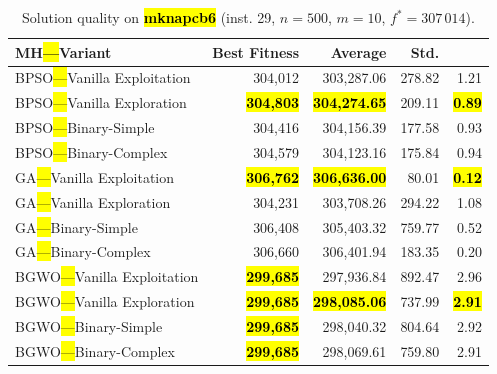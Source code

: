 \documentclass[mathematics,article,accept,moreauthors]{Definitions/mdpi}
\begin{document}
\vspace{-9pt}

\begin{table}[H]
  \small
  \caption{Solution quality on \textbf{\hl{mknapcb6}} (inst. 29, $n=500$, $m=10$, $f^*=307\,014$).}
  \label{tab:calidad_mknapcb6_29}
  \begin{tabularx}{\textwidth}{lRRRR}
    \toprule
    \textbf{MH\hl{---}Variant} &
    \textbf{Best Fitness} &
    \textbf{Average} &
    \textbf{Std.} &
    \textbf{} \\
    \midrule
    BPSO\hl{---}Vanilla Exploitation &         304,012 &        303,287.06 & 278.82 &         1.21 \\
    BPSO\hl{---}Vanilla Exploration  & \textbf{\hl{304,803}} & \textbf{\hl{304,274.65}} & 209.11 & \textbf{\hl{0.89}} \\
    BPSO\hl{---}Binary-Simple        &         304,416 &        304,156.39 & 177.58 &         0.93 \\
    BPSO\hl{---}Binary-Complex       &         304,579 &        304,123.16 & 175.84 &         0.94 \\
    \midrule
    GA\hl{---}Vanilla Exploitation   & \textbf{\hl{306,762}} & \textbf{\hl{306,636.00}} &  80.01 & \textbf{\hl{0.12}} \\
    GA\hl{---}Vanilla Exploration    &         304,231 &        303,708.26 & 294.22 &         1.08 \\
    GA\hl{---}Binary-Simple          &         306,408 &        305,403.32 & 759.77 &         0.52 \\
    GA\hl{---}Binary-Complex         &         306,660 &        306,401.94 & 183.35 &         0.20 \\
    \midrule
    BGWO\hl{---}Vanilla Exploitation & \textbf{\hl{299,685}} &        297,936.84 & 892.47 &         2.96 \\
    BGWO\hl{---}Vanilla Exploration  & \textbf{\hl{299,685}} & \textbf{\hl{298,085.06}} & 737.99 & \textbf{\hl{2.91}} \\
    BGWO\hl{---}Binary-Simple        & \textbf{\hl{299,685}} &        298,040.32 & 804.64 &         2.92 \\
    BGWO\hl{---}Binary-Complex       & \textbf{\hl{299,685}} &        298,069.61 & 759.80 &         2.91 \\


\bottomrule
\end{tabularx} %
\end{table}
\end{document}
